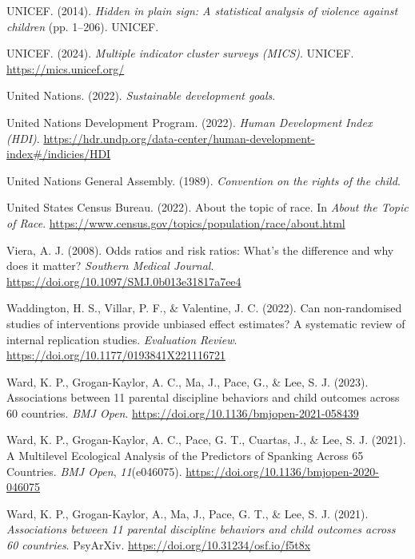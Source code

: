\documentclass[
  letterpaper,
  DIV=11,
  numbers=noendperiod]{scrreprt}
\newlength{\cslhangindent}
\newenvironment{CSLReferences}[2] %
 {\begin{list}{}{%
  \setlength{\itemindent}{0pt}
  \setlength{\leftmargin}{0pt}
  \setlength{\parsep}{0pt}
  \ifodd #1
   \setlength{\leftmargin}{\cslhangindent}
   \setlength{\itemindent}{-1\cslhangindent}
  \fi
  \setlength{\itemsep}{#2\baselineskip}}}
 {\end{list}}
\begin{document}
\begin{CSLReferences}{1}{0}
UNICEF. (2014). \emph{Hidden in plain sign: A statistical analysis of
violence against children} (pp. 1--206). UNICEF.

UNICEF. (2024). \emph{Multiple indicator cluster surveys (MICS)}.
UNICEF. \url{https://mics.unicef.org/}

United Nations. (2022). \emph{Sustainable development goals}.

United Nations Development Program. (2022). \emph{{Human Development
Index (HDI)}}.
\url{https://hdr.undp.org/data-center/human-development-index\#/indicies/HDI}

United Nations General Assembly. (1989). \emph{Convention on the rights
of the child}.

United States Census Bureau. (2022). About the topic of race. In
\emph{About the Topic of Race}.
\url{https://www.census.gov/topics/population/race/about.html}

Viera, A. J. (2008). Odds ratios and risk ratios: What's the difference
and why does it matter? \emph{Southern Medical Journal}.
\url{https://doi.org/10.1097/SMJ.0b013e31817a7ee4}

Waddington, H. S., Villar, P. F., \& Valentine, J. C. (2022). Can
non-randomised studies of interventions provide unbiased effect
estimates? A systematic review of internal replication studies.
\emph{Evaluation Review}.
\url{https://doi.org/10.1177/0193841X221116721}

Ward, K. P., Grogan-Kaylor, A. C., Ma, J., Pace, G., \& Lee, S. J.
(2023). Associations between 11 parental discipline behaviors and child
outcomes across 60 countries. \emph{BMJ Open}.
\url{https://doi.org/10.1136/bmjopen-2021-058439}

Ward, K. P., Grogan-Kaylor, A. C., Pace, G. T., Cuartas, J., \& Lee, S.
J. (2021). {A Multilevel Ecological Analysis of the Predictors of
Spanking Across 65 Countries}. \emph{BMJ Open}, \emph{11}(e046075).
\url{https://doi.org/10.1136/bmjopen-2020-046075}

Ward, K. P., Grogan-Kaylor, A., Ma, J., Pace, G. T., \& Lee, S. J.
(2021). \emph{Associations between 11 parental discipline behaviors and
child outcomes across 60 countries}. PsyArXiv.
\url{https://doi.org/10.31234/osf.io/f5t8x}


\end{CSLReferences}
\end{document}
